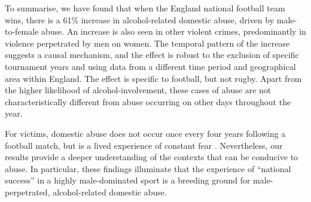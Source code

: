\documentclass[12pt, a4paper]{article}
\begin{document}


To summarise, we have found that when the England national football team wins, there is a 61\% increase in alcohol-related domestic abuse, driven by male-to-female abuse. An increase is also seen in other violent crimes, predominantly in violence perpetrated by men on women. The temporal pattern of the increase suggests a causal mechanism, and the effect is robust to the exclusion of specific tournament years and using data from a different time period and geographical area within England. The effect is specific to football, but not rugby. Apart from the higher likelihood of alcohol-involvement, these cases of abuse are not characteristically different from abuse occurring on other days throughout the year. 

For victims, domestic abuse does not occur once every four years following a football match, but is a lived experience of constant fear \citep{Brooks-Hay2018}. Nevertheless, our results provide a deeper understanding of the contexts that can be conducive to abuse. In particular, these findings illuminate that the experience of ``national success'' in a highly male-dominated sport is a breeding ground for male-perpetrated, alcohol-related domestic abuse.
\end{document}
